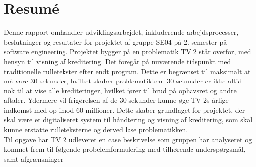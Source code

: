 \clearpage
\section{Resumé}
\begin{comment}
En  kort  introduktion  til  projektet  -  hvad  blev der arbejdet med og hvorfor.

•Problemformuleringen og vigtige afgrænsninger.

•Metode - hvordan angreb I problemet og hvordan realiserede I løsningen (hvem, hvad, hvorn ̊ar og hvorfor

)•Hovedresultater og konklusioner – hvad kom derud af arbejde
\end{comment}

Denne rapport omhandler udviklingsarbejdet, inkluderende arbejdsprocesser, beslutninger og resultater for projektet af gruppe SE04 på 2. semester på software engineering. Projektet bygger på en problematik TV 2 står overfor, med hensyn til visning af kreditering. Det foregår på nuværende tidspunkt med traditionelle rulletekster efter endt program. Dette er begrænset til maksimalt at må vare 30 sekunder, hvilket skaber problematikken. 30 sekunder er ikke altid nok til at vise alle krediteringer, hvilket fører til brud på ophavsret og andre aftaler. Ydermere vil frigørelsen af de 30 sekunder kunne øge TV 2s årlige indkomst med op imod 60 millioner. Dette skaber grundlaget for projektet, der skal være et digitaliseret system til håndtering og visning af kreditering, som skal kunne erstatte rulleteksterne og derved løse problematikken. \\

Til opgave har TV 2 udleveret en case beskrivelse som gruppen har analyseret og kommet frem til følgende probelemformulering med tilhørende underspørgsmål, samt afgrænsninger:\\

